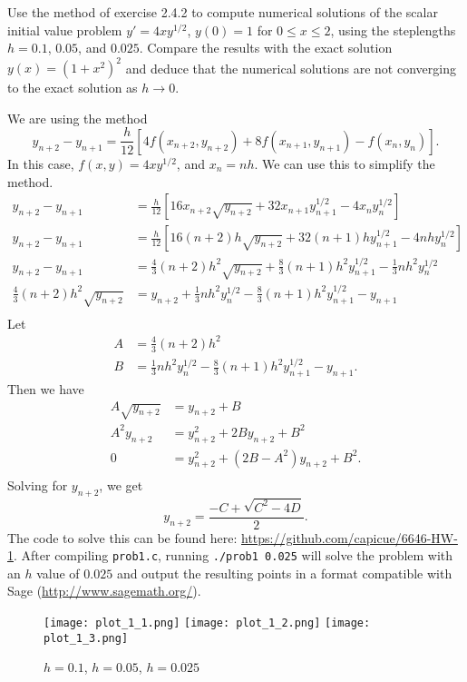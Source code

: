 \begin{problem}[L 2.4.2]
  Use the method of exercise 2.4.2 to compute numerical solutions of the scalar initial value problem $y' = 4xy^{1/2}$, $y(0) = 1$ for $0 \leq x \leq 2$, using the steplengths $h = 0.1$, $0.05$, and $0.025$. Compare the results with the exact solution $y(x) = (1 + x^2)^2$ and deduce that the numerical solutions are not converging to the exact solution as $h \to 0$.
\end{problem}

\begin{solution}
  We are using the method
  \[
    y_{n + 2} - y_{n + 1} = \frac{h}{12}\left[4 f(x_{n + 2}, y_{n + 2}) + 8 f(x_{n + 1}, y_{n + 1}) - f(x_n, y_n)\right].
  \]
  In this case, $f(x, y) = 4xy^{1/2}$, and $x_n = nh$. We can use this to simplify the method.
  \begin{align*}
    y_{n + 2} - y_{n + 1} &= \frac{h}{12}\left[16 x_{n + 2} \sqrt{y_{n + 2}} + 32 x_{n + 1} y_{n + 1}^{1/2} - 4 x_n y_n^{1/2}\right] \\
    y_{n + 2} - y_{n + 1} &= \frac{h}{12}\left[16 (n + 2) h \sqrt{y_{n + 2}} + 32 (n + 1) h y_{n + 1}^{1/2} - 4 n h y_n^{1/2}\right] \\
    y_{n + 2} - y_{n + 1} &= \frac{4}{3} (n + 2) h^2 \sqrt{y_{n + 2}} + \frac{8}{3} (n + 1) h^2 y_{n + 1}^{1/2} - \frac{1}{3} n h^2 y_n^{1/2} \\
    \frac{4}{3} (n + 2) h^2 \sqrt{y_{n + 2}} &= y_{n + 2} + \frac{1}{3} n h^2 y_n^{1/2} - \frac{8}{3} (n + 1) h^2 y_{n + 1}^{1/2} - y_{n + 1} \\
  \end{align*}
  Let
  \begin{align*}
    A &= \frac{4}{3} (n + 2) h^2 \\
    B &= \frac{1}{3} n h^2 y_n^{1/2} - \frac{8}{3} (n + 1) h^2 y_{n + 1}^{1/2} - y_{n + 1}.
  \end{align*}
  Then we have
  \begin{align*}
    A \sqrt{y_{n + 2}} &= y_{n + 2} + B \\
    A^2 y_{n + 2} &= y_{n + 2}^2 + 2 B y_{n + 2} + B^2 \\
    0 &= y_{n+2}^2 + (2B - A^2)y_{n+2} + B^2. \\
  \end{align*}
  Solving for $y_{n + 2}$, we get
  \[
    y_{n + 2} = \frac{-C + \sqrt{C^2 - 4D}}{2}.
  \]
  The code to solve this can be found here: \url{https://github.com/capicue/6646-HW-1}. After compiling \texttt{prob1.c}, running \texttt{./prob1 0.025} will solve the problem with an $h$ value of $0.025$ and output the resulting points in a format compatible with Sage (\url{http://www.sagemath.org/}).
  
  \begin{figure}[!ht]
    \centering
    \texttt{[image: plot\_1\_1.png]}
    \texttt{[image: plot\_1\_2.png]}
    \texttt{[image: plot\_1\_3.png]}
    \caption{$h = 0.1$, $h = 0.05$, $h = 0.025$}
    \label{fig:prob1}
  \end{figure}
\end{solution}
